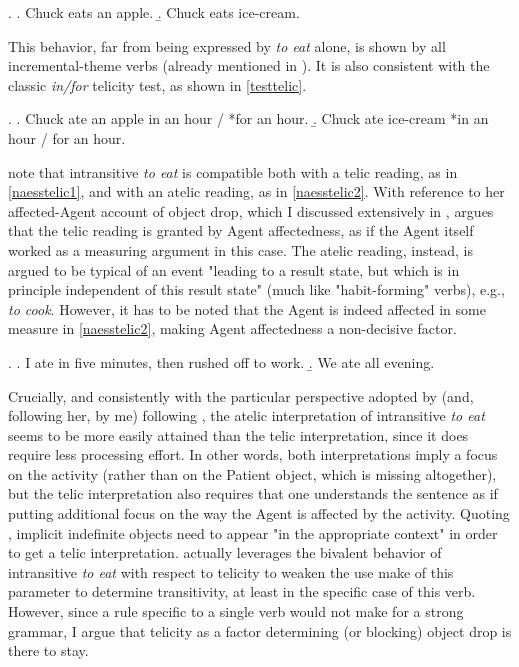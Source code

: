 \ex. \label{tennytelic} \a. \label{tennytelic1} Chuck eats an apple.
\b. \label{tennytelic2} Chuck eats ice-cream.

This behavior, far from being expressed by \textit{to eat} alone, is shown by all incremental-theme verbs (already mentioned in ). It is also consistent with the classic \textit{in/for} telicity test, as shown in \ref{testtelic}.

\ex. \label{testtelic} \a. \label{testtelic1} Chuck ate an apple in an hour / *for an hour.
\b. \label{testtelic2} Chuck ate ice-cream *in an hour / for an hour.

\textcite{Naess2007, Ruda2017, willim2006event, Naess2011} note that intransitive \textit{to eat} is compatible both with a telic reading, as in \ref{naesstelic1}, and with an atelic reading, as in \ref{naesstelic2}. With reference to her affected-Agent account of object drop, which I discussed extensively in , \textcite[78-79]{Naess2007} argues that the telic reading is granted by Agent affectedness, as if the Agent itself worked as a measuring argument in this case. The atelic reading, instead, is argued to be typical of an event "leading to a result state, but which is in principle independent of this result state" (much like  "habit-forming" verbs), e.g., \textit{to cook}. However, it has to be noted that the Agent is indeed affected in some measure in \ref{naesstelic2}, making Agent affectedness a non-decisive factor. 

\ex. \label{naesstelic} \a. \label{naesstelic1} I ate in five minutes, then rushed off to work.
\b. \label{naesstelic2} We ate all evening.

Crucially, and consistently with the particular perspective adopted by \textcite{Medina2007} (and, following her, by me) following \textcite{Olsen1997}, the atelic interpretation of intransitive \textit{to eat} seems to be more easily attained than the telic interpretation, since it does require less processing effort. In other words, both interpretations imply a focus on the activity (rather than on the Patient object, which is missing altogether), but the telic interpretation also requires that one understands the sentence as if putting additional focus on the way the Agent is affected by the activity. Quoting \textcite[4]{OlsenResnik1997}, implicit indefinite objects need to appear "in the appropriate context" in order to get a telic interpretation. \textcite[79]{Naess2007} actually leverages the bivalent behavior of intransitive \textit{to eat} with respect to telicity to weaken the use \textcite{HopperThompson1980} make of this parameter to determine transitivity, at least in the specific case of this verb. However, since a rule specific to a single verb would not make for a strong grammar, I argue that telicity as a factor determining (or blocking) object drop is there to stay.

